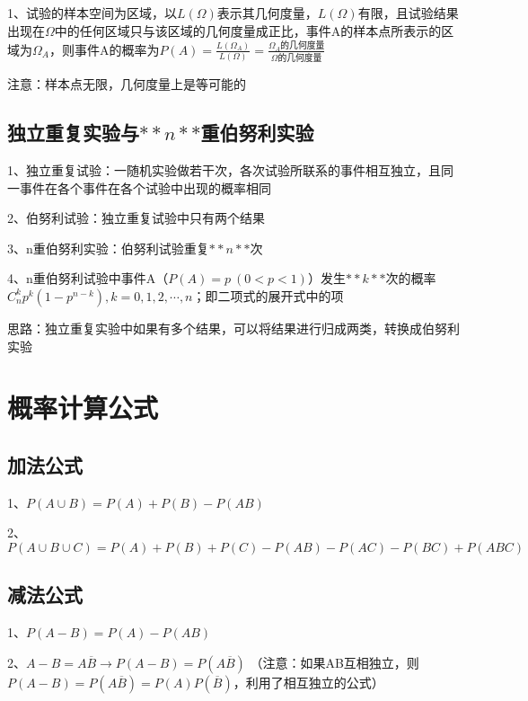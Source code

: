 1、试验的样本空间为区域，以$ L(\Omega) $表示其几何度量，$ L(\Omega) $有限，且试验结果出现在$ \Omega $中的任何区域只与该区域的几何度量成正比，事件A的样本点所表示的区域为$ \Omega _A $，则事件A的概率为$ P(A) = \frac{L(\Omega _A)}{L(\Omega)} = \frac{\Omega _A的几何度量}{\Omega 的几何度量} $

注意：样本点无限，几何度量上是等可能的



\subsection{独立重复实验与$ **n** $重伯努利实验}

1、独立重复试验：一随机实验做若干次，各次试验所联系的事件相互独立，且同一事件在各个事件在各个试验中出现的概率相同

2、伯努利试验：独立重复试验中只有两个结果

3、n重伯努利实验：伯努利试验重复$ **n** $次

4、n重伯努利试验中事件A（$ P(A) = p \ (0<p<1) $）发生$ **k** $次的概率$ C_n^kp^k(1-p^{n-k}),k=0,1,2,\cdots ,n $；即二项式的展开式中的项

思路：独立重复实验中如果有多个结果，可以将结果进行归成两类，转换成伯努利实验



\section{概率计算公式}



\subsection{加法公式}

1、$ P(A\cup B) = P(A)+P(B)-P(AB) $

2、$ P(A\cup B \cup C) = P(A)+P(B)+P(C)-P(AB)-P(AC)-P(BC)+P(ABC) $



\subsection{减法公式}

1、$ P(A - B) = P(A)-P(AB) $

2、$ A-B=A\overline B \rightarrow P(A-B) = P(A\overline B) $ （注意：如果AB互相独立，则$ P(A-B) = P(A\overline B)=P(A)P(\overline B) $，利用了相互独立的公式）



